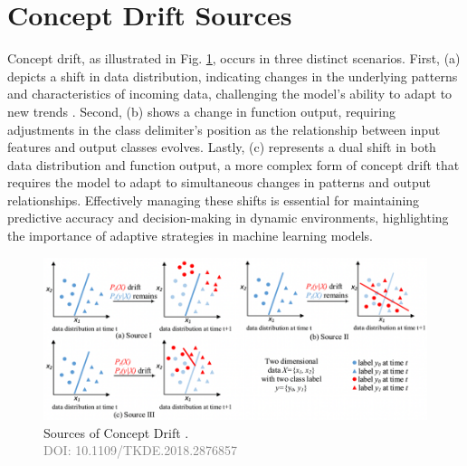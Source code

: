 \section{Concept Drift Sources}
\label{sec:background_concept_drift_sources}
Concept drift, as illustrated in Fig. \ref{fig:concept-drift-sources}, occurs in three distinct scenarios. First, (a) depicts a shift in data distribution, indicating changes in the underlying patterns and characteristics of incoming data, challenging the model's ability to adapt to new trends \cite{lu2016concept, gama2014survey, losing2016knn, storkey2008training}. Second, (b) shows a change in function output, requiring adjustments in the class delimiter's position as the relationship between input features and output classes evolves. Lastly, (c) represents a dual shift in both data distribution and function output, a more complex form of concept drift that requires the model to adapt to simultaneous changes in patterns and output relationships. Effectively managing these shifts is essential for maintaining predictive accuracy and decision-making in dynamic environments, highlighting the importance of adaptive strategies in machine learning models.
 
\begin{figure}[!ht]
    \centering
    \includegraphics[width=1.0\textwidth]{2_Background/figures/concept_drift_sources.png}
    \caption{Sources of Concept Drift \cite{8496795}. \\ \textcolor{gray}{\fontsize{10}{0}\selectfont DOI: 10.1109/TKDE.2018.2876857}}
    \label{fig:concept-drift-sources}
\end{figure}

